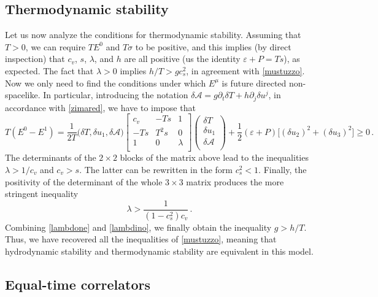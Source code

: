 \documentclass[a4paper, amsfonts, amssymb, amsmath, reprint, showkeys, nofootinbib, twoside,notitlepage,onecolumn,preprintnumbers]{revtex4-2}
\theoremstyle{definition}
\theoremstyle{theorem}
\theoremstyle{corollary}
\begin{document}
\subsection{Thermodynamic stability}

Let us now analyze the conditions for thermodynamic stability. Assuming that $T>0$, we can require $TE^0$ and $T\sigma$ to be positive, and this implies (by direct inspection) that $c_v$, $s$, $\lambda$, and $h$ are all positive (us the identity $\varepsilon+P=Ts$), as expected. The fact that $\lambda>0$ implies $h/T > gc_s^2$, in agreement with \eqref{mustuzzo}. Now we only need to find the conditions under which $E^\mu$ is future directed non-spacelike. In particular, introducing the notation $\delta \mathcal{A}=g \partial_t \delta T+h \partial_j \delta u^j$, in accordance with \eqref{zimared}, we have to impose that
\begin{equation}
T(E^0-E^1)=\dfrac{1}{2T} \big( \delta T , \delta u_1, \delta \mathcal{A} \big) \begin{bmatrix}
c_v & -Ts & 1 \\
-Ts & T^2 s & 0 \\
1 & 0 & \lambda \\
\end{bmatrix}
\begin{pmatrix}
\delta T \\
\delta u_1 \\
\delta \mathcal{A} \\
\end{pmatrix}
 + \dfrac{1}{2}(\varepsilon {+}P) \big[(\delta u_2)^2 + (\delta u_3)^2 \big] \geq 0 \, .
\end{equation}
The determinants of the $2\times 2$ blocks of the matrix above lead to the inequalities $\lambda>1/c_v$ and $c_v>s$. The latter can be rewritten in the form $c_s^2<1$. Finally, the positivity of the determinant of the whole $3 \times 3$ matrix produces the more stringent inequality
\begin{equation}\label{lambdino}
\lambda > \dfrac{1}{(1-c_s^2)c_v} \, .
\end{equation}
Combining \eqref{lambdone} and \eqref{lambdino}, we finally obtain the inequality $g>h/T$. Thus, we have recovered all the inequalities of \eqref{mustuzzo}, meaning that hydrodynamic stability and thermodynamic stability are equivalent in this model.

\subsection{Equal-time correlators}
\end{document}
